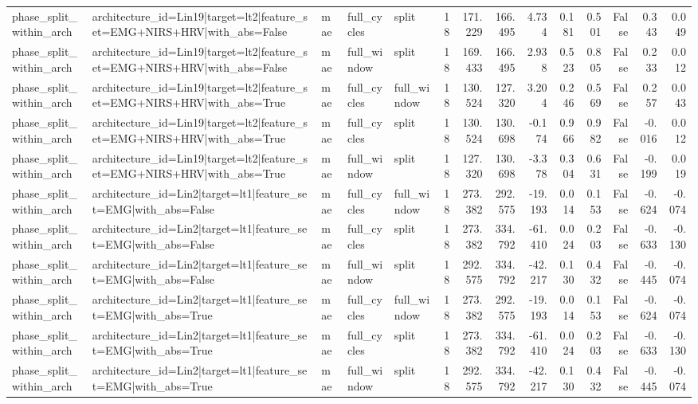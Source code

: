 \begin{table}
\begin{tabular}{lllllrrrrrrrrr}
phase_split_within_arch & architecture_id=Lin19|target=lt2|feature_set=EMG+NIRS+HRV|with_abs=False & mae & full_cycles & split & 18 & 171.229 & 166.495 & 4.734 & 0.181 & 0.501 & False & 0.343 & 0.049 \\
phase_split_within_arch & architecture_id=Lin19|target=lt2|feature_set=EMG+NIRS+HRV|with_abs=False & mae & full_window & split & 18 & 169.433 & 166.495 & 2.938 & 0.523 & 0.805 & False & 0.233 & 0.012 \\
phase_split_within_arch & architecture_id=Lin19|target=lt2|feature_set=EMG+NIRS+HRV|with_abs=True & mae & full_cycles & full_window & 18 & 130.524 & 127.320 & 3.204 & 0.246 & 0.569 & False & 0.257 & 0.043 \\
phase_split_within_arch & architecture_id=Lin19|target=lt2|feature_set=EMG+NIRS+HRV|with_abs=True & mae & full_cycles & split & 18 & 130.524 & 130.698 & -0.174 & 0.966 & 0.982 & False & -0.016 & 0.012 \\
phase_split_within_arch & architecture_id=Lin19|target=lt2|feature_set=EMG+NIRS+HRV|with_abs=True & mae & full_window & split & 18 & 127.320 & 130.698 & -3.378 & 0.304 & 0.631 & False & -0.199 & 0.019 \\
phase_split_within_arch & architecture_id=Lin2|target=lt1|feature_set=EMG|with_abs=False & mae & full_cycles & full_window & 18 & 273.382 & 292.575 & -19.193 & 0.014 & 0.153 & False & -0.624 & -0.074 \\
phase_split_within_arch & architecture_id=Lin2|target=lt1|feature_set=EMG|with_abs=False & mae & full_cycles & split & 18 & 273.382 & 334.792 & -61.410 & 0.024 & 0.203 & False & -0.633 & -0.130 \\
phase_split_within_arch & architecture_id=Lin2|target=lt1|feature_set=EMG|with_abs=False & mae & full_window & split & 18 & 292.575 & 334.792 & -42.217 & 0.130 & 0.432 & False & -0.445 & -0.074 \\
phase_split_within_arch & architecture_id=Lin2|target=lt1|feature_set=EMG|with_abs=True & mae & full_cycles & full_window & 18 & 273.382 & 292.575 & -19.193 & 0.014 & 0.153 & False & -0.624 & -0.074 \\
phase_split_within_arch & architecture_id=Lin2|target=lt1|feature_set=EMG|with_abs=True & mae & full_cycles & split & 18 & 273.382 & 334.792 & -61.410 & 0.024 & 0.203 & False & -0.633 & -0.130 \\
phase_split_within_arch & architecture_id=Lin2|target=lt1|feature_set=EMG|with_abs=True & mae & full_window & split & 18 & 292.575 & 334.792 & -42.217 & 0.130 & 0.432 & False & -0.445 & -0.074 \\

\end{tabular}
\end{table}
